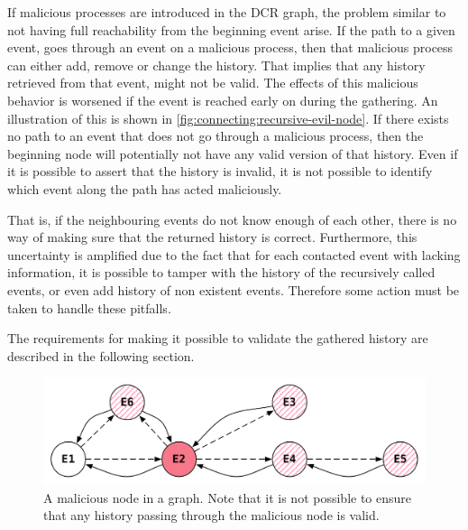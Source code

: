 	If malicious processes are introduced in the DCR graph, the problem similar to not having full reachability from the beginning event arise. If the path to a given event, goes through an event on a malicious process, then that malicious process can either add, remove or change the history. That implies that any history retrieved from that event, might not be valid. The effects of this malicious behavior is worsened if the event is reached early on during the gathering. An illustration of this is shown in \autoref{fig:connecting:recursive-evil-node}. If there exists no path to an event that does not go through a malicious process, then the beginning node will potentially not have any valid version of that history. Even if it is possible to assert that the history is invalid, it is not possible to identify which event along the path has acted maliciously.
	
	\newpar That is, if the neighbouring events do not know enough of each other, there is no way of making sure that the returned history is correct. Furthermore, this uncertainty is amplified due to the fact that for each contacted event with lacking information, it is possible to tamper with the history of the recursively called events, or even add history of non existent events. Therefore some action must be taken to handle these pitfalls.
	
	The requirements for making it possible to validate the gathered history are described in the following section. 
	
	\begin{figure}[H]
		\centering
		\includegraphics[width=\textwidth]{4connect/images/recursive-evil-node.pdf}
		\caption{A malicious node in a graph. Note that it is not possible to ensure that any history passing through the malicious node is valid.}
		\label{fig:connecting:recursive-evil-node}
	\end{figure}
	
